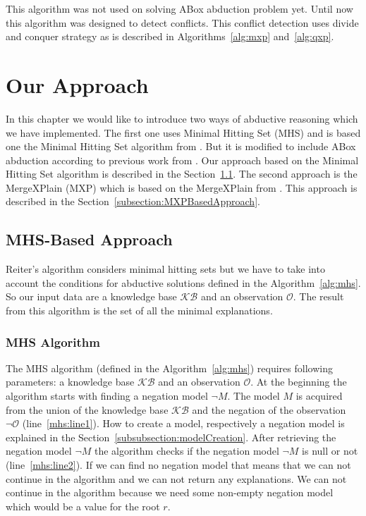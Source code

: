 \documentclass[12pt,a4paper]{article}
\begin{document}
This algorithm was not used on solving ABox abduction problem yet. Until now this algorithm was designed to detect conflicts. This conflict detection uses divide and conquer strategy as is described in Algorithms~\ref{alg:mxp} and~\ref{alg:qxp}.

\pagebreak
\section{Our Approach}
In this chapter we would like to introduce two ways of abductive reasoning which we have implemented. The first one uses Minimal Hitting Set (MHS) and is based one the Minimal Hitting Set algorithm from \cite{reiterHS}. But it is modified to include ABox abduction according to previous work from \cite{pukancovaPreliminaryReport}. Our approach based on the Minimal Hitting Set algorithm is described in the Section~\ref{subsection:MHSBasedApproach}. The second approach is the MergeXPlain (MXP) which is based on the MergeXPlain from \cite{MXP}. This approach is described in the Section~\ref{subsection:MXPBasedApproach}.

\subsection{MHS-Based Approach}
\label{subsection:MHSBasedApproach}
Reiter's algorithm considers minimal hitting sets but we have to take into account the conditions for abductive solutions defined in the Algorithm~\ref{alg:mhs}. So our input data are a knowledge base $\mathcal{KB}$ and an observation $\mathcal{O}$. The result from this algorithm is the set of all the minimal explanations.

\subsubsection{MHS Algorithm}
The MHS algorithm (defined in the Algorithm~\ref{alg:mhs}) requires following parameters: a knowledge base $\mathcal{KB}$ and an observation $\mathcal{O}$. At the beginning the algorithm starts with finding a negation model $\neg M$. The model $M$ is acquired from the union of the knowledge base $\mathcal{KB}$ and the negation of the observation $\neg \mathcal{O}$ (line~\ref{mhs:line1}). How to create a model, respectively a negation model is explained in the Section~\ref{subsubsection:modelCreation}. After retrieving the negation model $\neg M$ the algorithm checks if the negation model $\neg M$ is null or not (line~\ref{mhs:line2}). If we can find no negation model that means that we can not continue in the algorithm and we can not return any explanations. We can not continue in the algorithm because we need some non-empty negation model which would be a value for the root $r$.
\end{document}
